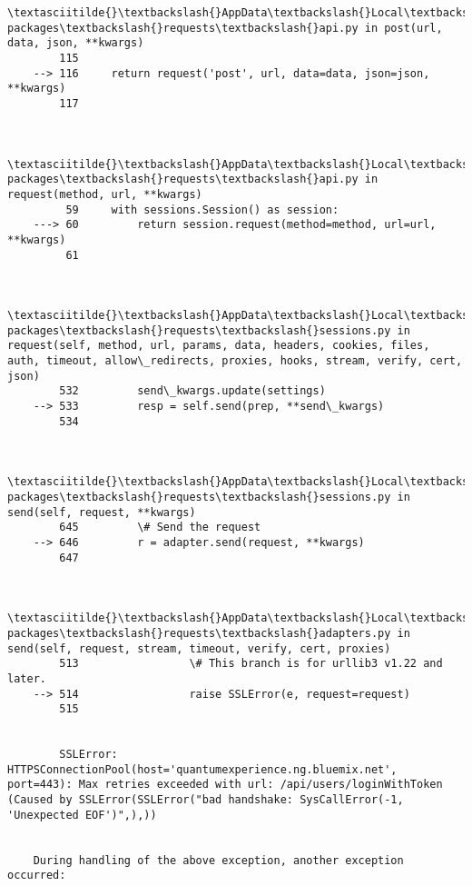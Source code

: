 \documentclass[11pt]{article}
\begin{document}
\begin{Verbatim}[commandchars=\\\{\}]
        \textasciitilde{}\textbackslash{}AppData\textbackslash{}Local\textbackslash{}Continuum\textbackslash{}anaconda3\textbackslash{}lib\textbackslash{}site-packages\textbackslash{}requests\textbackslash{}api.py in post(url, data, json, **kwargs)
        115 
    --> 116     return request('post', url, data=data, json=json, **kwargs)
        117 
    

        \textasciitilde{}\textbackslash{}AppData\textbackslash{}Local\textbackslash{}Continuum\textbackslash{}anaconda3\textbackslash{}lib\textbackslash{}site-packages\textbackslash{}requests\textbackslash{}api.py in request(method, url, **kwargs)
         59     with sessions.Session() as session:
    ---> 60         return session.request(method=method, url=url, **kwargs)
         61 
    

        \textasciitilde{}\textbackslash{}AppData\textbackslash{}Local\textbackslash{}Continuum\textbackslash{}anaconda3\textbackslash{}lib\textbackslash{}site-packages\textbackslash{}requests\textbackslash{}sessions.py in request(self, method, url, params, data, headers, cookies, files, auth, timeout, allow\_redirects, proxies, hooks, stream, verify, cert, json)
        532         send\_kwargs.update(settings)
    --> 533         resp = self.send(prep, **send\_kwargs)
        534 
    

        \textasciitilde{}\textbackslash{}AppData\textbackslash{}Local\textbackslash{}Continuum\textbackslash{}anaconda3\textbackslash{}lib\textbackslash{}site-packages\textbackslash{}requests\textbackslash{}sessions.py in send(self, request, **kwargs)
        645         \# Send the request
    --> 646         r = adapter.send(request, **kwargs)
        647 
    

        \textasciitilde{}\textbackslash{}AppData\textbackslash{}Local\textbackslash{}Continuum\textbackslash{}anaconda3\textbackslash{}lib\textbackslash{}site-packages\textbackslash{}requests\textbackslash{}adapters.py in send(self, request, stream, timeout, verify, cert, proxies)
        513                 \# This branch is for urllib3 v1.22 and later.
    --> 514                 raise SSLError(e, request=request)
        515 
    

        SSLError: HTTPSConnectionPool(host='quantumexperience.ng.bluemix.net', port=443): Max retries exceeded with url: /api/users/loginWithToken (Caused by SSLError(SSLError("bad handshake: SysCallError(-1, 'Unexpected EOF')",),))

        
    During handling of the above exception, another exception occurred:
    


\end{Verbatim}
\end{document}
